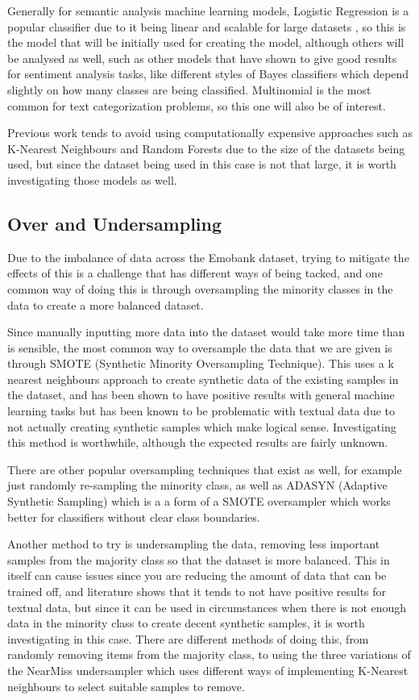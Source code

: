 Generally for semantic analysis machine learning models, Logistic Regression is a popular classifier due to it being linear and scalable for large datasets \cite{towardsDS}, so this is the model that will be initially used for creating the model, although others will be analysed as well, such as other models that have shown to give good results for sentiment analysis tasks, like different styles of Bayes classifiers which depend slightly on how many classes are being classified. Multinomial is the most common for text categorization problems, so this one will also be of interest. \cite{frank2006naive}

Previous work tends to avoid using computationally expensive approaches such as K-Nearest Neighbours and Random Forests due to the size of the datasets being used, but since the dataset being used in this case is not that large, it is worth investigating those models as well.


\subsection{Over and Undersampling}

Due to the imbalance of data across the Emobank dataset, trying to mitigate the effects of this is a challenge that has different ways of being tacked, and one common way of doing this is through oversampling the minority classes in the data to create a more balanced dataset. 

Since manually inputting more data into the dataset would take more time than is sensible, the most common way to oversample the data that we are given is through SMOTE (Synthetic Minority Oversampling Technique). This uses a k nearest neighbours approach to create synthetic data of the existing samples in the dataset, and has been shown to have positive results with general machine learning tasks but has been known to be problematic with textual data due to not actually creating synthetic samples which make logical sense. Investigating this method is worthwhile, although the expected results are fairly unknown.

There are other popular oversampling techniques that exist as well, for example just randomly re-sampling the minority class, as well as ADASYN (Adaptive Synthetic Sampling) which is a a form of a SMOTE oversampler which works better for classifiers without clear class boundaries.

Another method to try is undersampling the data, removing less important samples from the majority class so that the dataset is more balanced. This in itself can cause issues since you are reducing the amount of data that can be trained off, and literature shows that it tends to not have positive results for textual data, but since it can be used in circumstances when there is not enough data in the minority class to create decent synthetic samples, it is worth investigating in this case. \cite{more2016survey} There are different methods of doing this, from randomly removing items from the majority class, to using the three variations of the NearMiss undersampler which uses different ways of implementing K-Nearest neighbours to select suitable samples to remove. 

